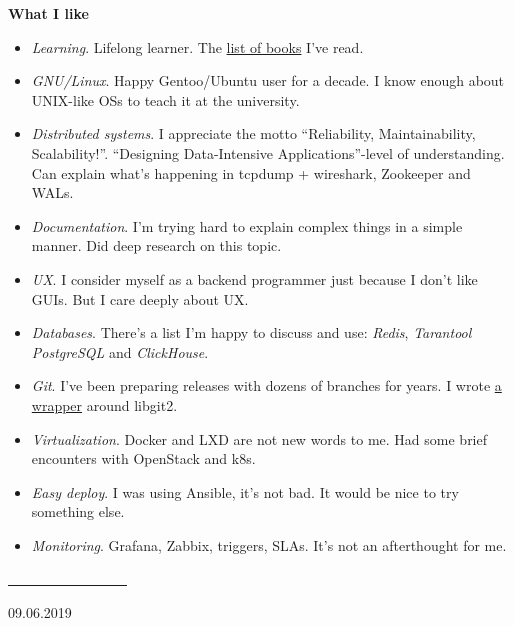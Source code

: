 \documentclass[final]{letter}
\begin{document}
{\bf What I like}
\begin{itemize}
\item \textit{Learning}. Lifelong learner. The \href{https://www.goodreads.com/review/list/43338630-sergey-machulskis?shelf=professional}{list of books} I've read.
\item \textit{GNU/Linux}. Happy Gentoo/Ubuntu user for a decade. I know enough about UNIX-like OSs to teach it at the university.
\item \textit{Distributed systems}. I appreciate the motto ``Reliability, Maintainability, Scalability!''. ``Designing Data-Intensive Applications''-level of understanding. Can explain what's happening in tcpdump + wireshark, Zookeeper and WALs.
\item \textit{Documentation}. I'm trying hard to explain complex things in a simple manner. Did deep research on this topic.
\item \textit{UX}. I consider myself as a backend programmer just because I don't like GUIs. But I care deeply about UX.
\item \textit{Databases}. There's a list I'm happy to discuss and use: \textit{Redis}, \textit{Tarantool} \textit{PostgreSQL} and \textit{ClickHouse}.
\item \textit{Git}. I've been preparing releases with dozens of branches for years. I wrote \href{https://github.com/neexee/review/tree/master/components/Git}{a wrapper} around libgit2.
\item \textit{Virtualization}. Docker and LXD are not new words to me. Had some brief encounters with OpenStack and k8s.
\item \textit{Easy deploy}. I was using Ansible, it's not bad. It would be nice to try something else.
\item \textit{Monitoring}. Grafana, Zabbix, triggers, SLAs. It's not an afterthought for me.
\end{itemize}

\vfill
\begin{center}
\underline{~~~~~~~~~~~~~~~~~}

09.06.2019
\end{center}
\end{document}
